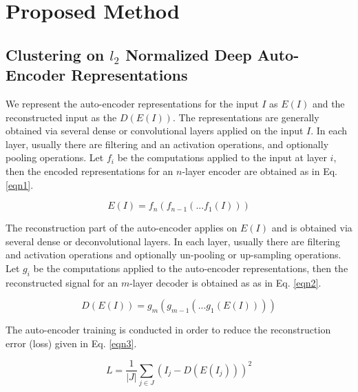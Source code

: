 \documentclass[conference]{IEEEtran}
\begin{document}
\section{Proposed Method}

\subsection{Clustering on $l_2$ Normalized Deep Auto-Encoder Representations}

We represent the auto-encoder representations for the input $I$ as $E(I)$ and the reconstructed input as the $D(E(I))$. The representations are generally obtained via several dense or convolutional layers applied on the input $I$. In each layer, usually there are filtering and an activation operations, and optionally pooling operations. Let $f_i$ be the computations applied to the input at layer $i$, then the encoded representations for an $n$-layer encoder are obtained as in Eq. \ref{eqn1}.

\begin{equation}
\label{eqn1}
E(I)=f_n(f_{n-1}(...f_1(I)))
\end{equation}

The reconstruction part of the auto-encoder applies on $E(I)$ and is obtained via several dense or deconvolutional layers. In each layer, usually there are filtering and activation operations and optionally un-pooling or up-sampling operations. Let $g_i$ be the computations applied to the auto-encoder representations, then the reconstructed signal for an $m$-layer decoder is obtained as as in Eq. \ref{eqn2}.

\begin{equation}
\label{eqn2}
D(E(I))=g_m(g_{m-1}(...g_1(E(I))))
\end{equation}

The auto-encoder training is conducted in order to reduce the reconstruction error (loss) given in Eq. \ref{eqn3}.

\begin{equation}
\label{eqn3}
L=\frac{1}{|J|}\sum_{j \in J} (I_j-D(E(I_j)))^2
\end{equation}

%
%
\end{document}
